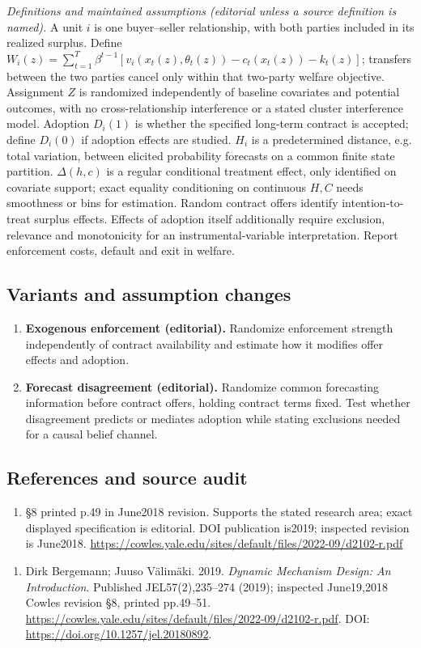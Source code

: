 \documentclass[11pt,a4paper]{article}
\begin{document}
\emph{Definitions and maintained assumptions (editorial unless a source definition is named).} A unit \(i\) is one buyer--seller relationship, with both parties included in its realized surplus. Define \(W_i(z)=\sum_{t=1}^T\beta^{t-1}[v_i(x_t(z),\theta_t(z))-c_t(x_t(z))-k_t(z)]\); transfers between the two parties cancel only within that two-party welfare objective. Assignment \(Z\) is randomized independently of baseline covariates and potential outcomes, with no cross-relationship interference or a stated cluster interference model. Adoption \(D_i(1)\) is whether the specified long-term contract is accepted; define \(D_i(0)\) if adoption effects are studied. \(H_i\) is a predetermined distance, e.g. total variation, between elicited probability forecasts on a common finite state partition. \(\Delta(h,c)\) is a regular conditional treatment effect, only identified on covariate support; exact equality conditioning on continuous \(H,C\) needs smoothness or bins for estimation. Random contract offers identify intention-to-treat surplus effects. Effects of adoption itself additionally require exclusion, relevance and monotonicity for an instrumental-variable interpretation. Report enforcement costs, default and exit in welfare.
\subsection*{Variants and assumption changes}
\begin{enumerate}
\item \textbf{Exogenous enforcement (editorial).} Randomize enforcement strength independently of contract availability and estimate how it modifies offer effects and adoption.
\item \textbf{Forecast disagreement (editorial).} Randomize common forecasting information before contract offers, holding contract terms fixed. Test whether disagreement predicts or mediates adoption while stating exclusions needed for a causal belief channel.
\end{enumerate}
\subsection*{References and source audit}
\begin{enumerate}
\item §8 printed p.49 in June2018 revision. Supports the stated research area; exact displayed specification is editorial. DOI publication is2019; inspected revision is June2018. \url{https://cowles.yale.edu/sites/default/files/2022-09/d2102-r.pdf}
\end{enumerate}
\begin{enumerate}\raggedright
\item\hypertarget{definitions:source:30007575:1}{} Dirk Bergemann; Juuso Välimäki. 2019. \emph{Dynamic Mechanism Design: An Introduction}. Published JEL57(2),235–274 (2019); inspected June19,2018 Cowles revision §8, printed pp.49–51.
\url{https://cowles.yale.edu/sites/default/files/2022-09/d2102-r.pdf}.
DOI: \url{https://doi.org/10.1257/jel.20180892}.
\end{enumerate}
\end{document}
